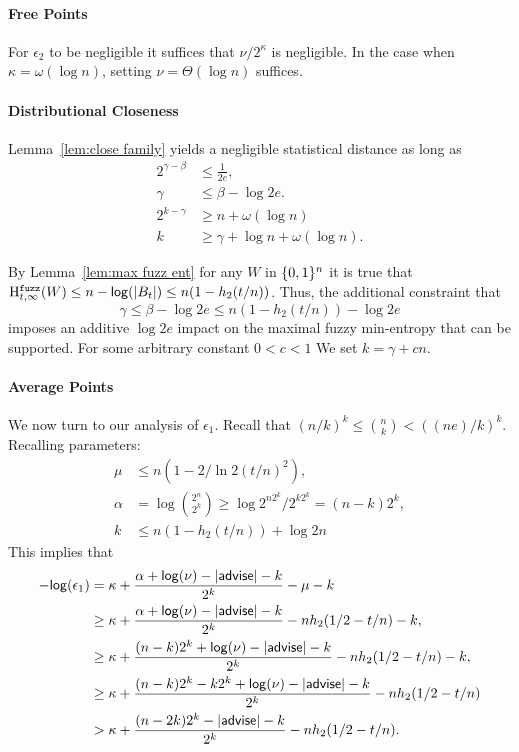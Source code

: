 \paragraph{Free Points}
For $\epsilon_2$ to be negligible it suffices that $\nu/2^\kappa$ is negligible.  In the case when $\kappa = \omega(\log{n})$, setting $\nu = \Theta(\log{n})$ suffices.
\paragraph{Distributional Closeness}
 Lemma~\ref{lem:close family} yields a negligible statistical distance as long as 
\begin{align*}
2^{\gamma - \beta} &\le \frac{1}{2e},\\
 \gamma &\le \beta -\log{2e}.\\
2^{k-\gamma}&\ge n+\omega(\log n)\\
k &\ge \gamma + \log{n+ \omega(\log{n})}.
\end{align*}


By Lemma~\ref{lem:max fuzz ent} for any $W$ in $\{0, 1\}^n$ it is true that $\mathrm{H}^{\mathtt{fuzz}}_{t,\infty}(W) \le n -\mathsf{log}\!\left(|B_t|\right) \le n(1-h_2(t/n))$.  Thus, the additional constraint that 
\[
\gamma \le \beta - \log{2e}
\le n(1-h_2(t/n)) - \log{2e}\] imposes an additive $\log{2e}$ impact on the maximal fuzzy min-entropy that can be supported. 
For some arbitrary constant $0<c < 1$ We set $k = \gamma + cn$. 

\paragraph{Average Points} 
We now turn to our analysis of $\epsilon_1$.  Recall that $(n/k)^k \le {n\choose k} < ((ne)/k)^k$.  Recalling parameters: 
\begin{align*}
\mu&\le n(1-2/\ln 2 (t/n)^2),\\
\alpha &= \log{2^n\choose 2^k} \ge \log{2^{n2^k} /2^{k2^k}} = (n-k)2^k,\\
k &\le n(1-h_2(t/n)) + \log{2n}
\end{align*}
This implies that 
\begin{align*}
-\mathsf{log}\!\left(\epsilon_1\right)&= \kappa+\frac{\alpha +\mathsf{log}\!\left(\nu\right)-|{\mathsf{advise}}|-k}{2^k} - \mu -k\\
&\ge  \kappa+\frac{\alpha +\mathsf{log}\!\left(\nu\right)-|{\mathsf{advise}}|-k}{2^k} - nh_2(1/2-t/n) - k,\\
&\ge  \kappa+\frac{(n-k)2^k +\mathsf{log}\!\left(\nu\right)-|{\mathsf{advise}}|-k}{2^k} - nh_2(1/2-t/n) - k,\\
&\ge  \kappa+\frac{(n-k)2^k-k2^{k} +\mathsf{log}\!\left(\nu\right)-|{\mathsf{advise}}|-k}{2^k} - nh_2(1/2-t/n)\\
&>  \kappa+\frac{(n-2k)2^k-|{\mathsf{advise}}|-k}{2^k} - nh_2(1/2-t/n) .
\end{align*}

